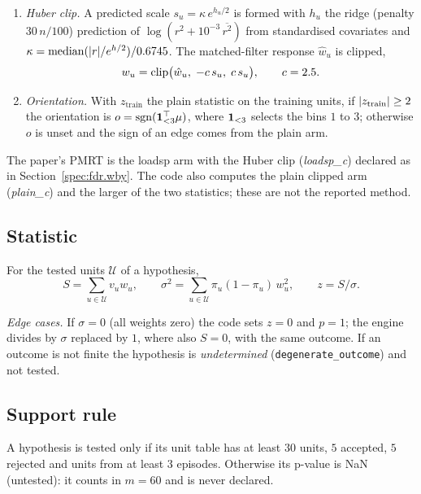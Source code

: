 \begin{enumerate}
\item \emph{Huber clip.} A predicted scale $s_u = \kappa\, e^{h_u/2}$ is formed with $h_u$ the ridge (penalty $30\, n/100$) prediction of $\log(r^2 + 10^{-3}\,\overline{r^2})$ from standardised covariates and $\kappa = \mathrm{median}(\lvert r\rvert/e^{h/2})/0.6745$. The matched-filter response $\hat w_u$ is clipped,
\begin{equation*}
w_u = \operatorname{clip}\bigl(\hat w_u,\; -c\, s_u,\; c\, s_u\bigr), \qquad c = 2.5 .
\end{equation*}
\item \emph{Orientation.} With $z_{\mathrm{train}}$ the plain statistic on the training units, if $\lvert z_{\mathrm{train}}\rvert \ge 2$ the orientation is $o = \mathrm{sgn}(\mathbf{1}_{<3}^\top \mu)$, where $\mathbf{1}_{<3}$ selects the bins $1$ to $3$; otherwise $o$ is unset and the sign of an edge comes from the plain arm.
\end{enumerate}

\noindent The paper's PMRT is the loadsp arm with the Huber clip (\emph{loadsp\_c}) declared as in Section~\ref{spec:fdr.wby}. The code also computes the plain clipped arm (\emph{plain\_c}) and the larger of the two statistics; these are not the reported method.




\subsection{Statistic}
\label{spec:pmrt.stat}

\begin{definition}
For the tested units $\mathcal{U}$ of a hypothesis,
\begin{equation*}
S = \sum_{u \in \mathcal{U}} v_u w_u, \qquad
\sigma^2 = \sum_{u \in \mathcal{U}} \pi_u (1 - \pi_u)\, w_u^2, \qquad
z = S / \sigma .
\end{equation*}
\end{definition}

\noindent \emph{Edge cases.} If $\sigma = 0$ (all weights zero) the code sets $z = 0$ and $p = 1$; the engine divides by $\sigma$ replaced by $1$, where also $S = 0$, with the same outcome. If an outcome is not finite the hypothesis is \emph{undetermined} (\texttt{degenerate\_outcome}) and not tested.


\subsection{Support rule}
\label{spec:pmrt.support}

A hypothesis is tested only if its unit table has at least $30$ units, $5$ accepted, $5$ rejected and units from at least $3$ episodes. Otherwise its p-value is NaN (untested): it counts in $m = 60$ and is never declared.
